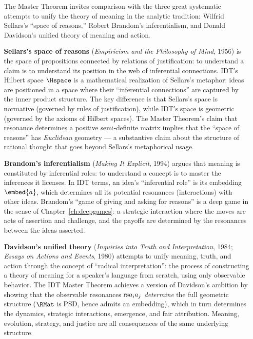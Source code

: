 \begin{interpretation}
\label{interp:ch22:brandom_sellars_davidson}
The Master Theorem invites comparison with the three great systematic
attempts to unify the theory of meaning in the analytic tradition: Wilfrid
Sellars's ``space of reasons,'' Robert Brandom's inferentialism, and
Donald Davidson's unified theory of meaning and action.

\textbf{Sellars's space of reasons} (\textit{Empiricism and the Philosophy
of Mind}, 1956) is the space of propositions connected by relations of
justification: to understand a claim is to understand its position in the
web of inferential connections.  IDT's Hilbert space $\Hspace$ is a
mathematical realization of Sellars's metaphor: ideas are positioned in
a space where their ``inferential connections'' are captured by the
inner product structure.  The key difference is that Sellars's space
is normative (governed by rules of justification), while IDT's space is
geometric (governed by the axioms of Hilbert spaces).  The Master
Theorem's claim that resonance determines a positive semi-definite
matrix implies that the ``space of reasons'' has \emph{Euclidean}
geometry --- a substantive claim about the structure of rational thought
that goes beyond Sellars's metaphorical usage.

\textbf{Brandom's inferentialism} (\textit{Making It Explicit}, 1994)
argues that meaning is constituted by inferential roles: to understand a
concept is to master the inferences it licenses.  In IDT terms, an idea's
``inferential role'' is its embedding $\embed{a}$, which determines all
its potential resonances (interactions) with other ideas.  Brandom's
``game of giving and asking for reasons'' is a deep game in the sense
of Chapter~\ref{ch:deepgames}: a strategic interaction where the moves
are acts of assertion and challenge, and the payoffs are determined by
the resonances between the ideas asserted.

\textbf{Davidson's unified theory} (\textit{Inquiries into Truth and
Interpretation}, 1984; \textit{Essays on Actions and Events}, 1980)
attempts to unify meaning, truth, and action through the concept of
``radical interpretation'': the process of constructing a theory of
meaning for a speaker's language from scratch, using only observable
behavior.  The IDT Master Theorem achieves a version of Davidson's
ambition by showing that the observable resonances $\mathrm{rs}{a_i}{a_j}$
\emph{determine} the full geometric structure ($\RMat$ is PSD, hence
admits an embedding), which in turn determines the dynamics, strategic
interactions, emergence, and fair attribution.  Meaning, evolution,
strategy, and justice are all consequences of the same underlying
structure.


\end{interpretation}
